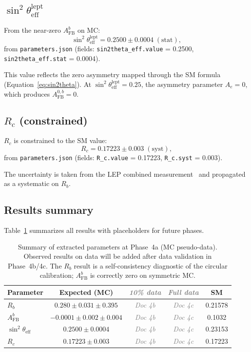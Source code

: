 \documentclass[11pt,a4paper]{article}
\newcommand{\tbd}[1]{\textcolor{gray}{\textit{#1}}}
\begin{document}
\subsection{$\sin^2\theta_\mathrm{eff}^\mathrm{lept}$}
\label{sec:result_sin2theta}

From the near-zero $A_\mathrm{FB}^b$ on MC:
\begin{equation}
\sin^2\theta_\mathrm{eff}^\mathrm{lept} = 0.2500 \pm 0.0004\;\mathrm{(stat)},
\label{eq:sin2theta_result}
\end{equation}
from \texttt{parameters.json} (fields: \texttt{sin2theta\_eff.value} = 0.2500,
\texttt{sin2theta\_eff.stat} = 0.0004).

This value reflects the zero asymmetry mapped through the SM formula
(Equation~\ref{eq:sin2theta}). At $\sin^2\theta_\mathrm{eff}^\mathrm{lept} = 0.25$,
the asymmetry parameter $A_e = 0$, which produces $A_\mathrm{FB}^{0,b} = 0$.

\subsection{$R_c$ (constrained)}
\label{sec:result_rc}

$R_c$ is constrained to the SM value:
\begin{equation}
R_c = 0.17223 \pm 0.003\;\mathrm{(syst)},
\label{eq:rc_result}
\end{equation}
from \texttt{parameters.json} (fields: \texttt{R\_c.value} = 0.17223,
\texttt{R\_c.syst} = 0.003).

The uncertainty is taken from the LEP combined measurement~\cite{LEP:EWWG:2005}
and propagated as a systematic on $R_b$.

\subsection{Results summary}
\label{sec:result_summary}

Table~\ref{tab:results_summary} summarizes all results with placeholders for
future phases.

\begin{table}[htbp]
\centering
\caption{Summary of extracted parameters at Phase~4a (MC pseudo-data). Observed
results on data will be added after data validation in Phase~4b/4c. The $R_b$ result
is a self-consistency diagnostic of the circular calibration; $A_\mathrm{FB}^b$ is
correctly zero on symmetric MC.}
\label{tab:results_summary}
\begin{tabular}{lcccc}
\toprule
Parameter & Expected (MC) & \tbd{10\% data} & \tbd{Full data} & SM \\
\midrule
$R_b$ & $0.280 \pm 0.031 \pm 0.395$ & \tbd{Doc 4b} & \tbd{Doc 4c} & 0.21578 \\
$A_\mathrm{FB}^b$ & $-0.0001 \pm 0.002 \pm 0.004$ & \tbd{Doc 4b} & \tbd{Doc 4c} & 0.1032 \\
$\sin^2\theta_\mathrm{eff}$ & $0.2500 \pm 0.0004$ & \tbd{Doc 4b} & \tbd{Doc 4c} & 0.23153 \\
$R_c$ & $0.17223 \pm 0.003$ & \tbd{Doc 4b} & \tbd{Doc 4c} & 0.17223 \\
\bottomrule
\end{tabular}
\end{table}
\end{document}
